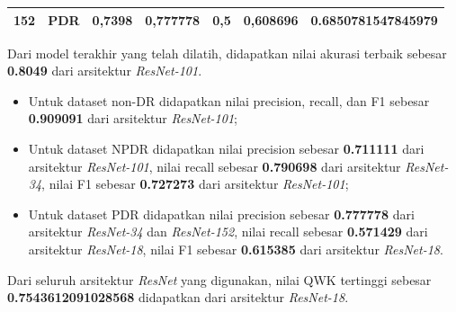 \begin{table}[hbtp]
\begin{center}
\begin{tabular}{|c|l|c|l|l|l|c|}
			\multirow{-3}{*}{152} & PDR                                                & \multirow{-3}{*}{0,7398} & \textbf{0,777778}                                          & 0,5                                              & 0,608696                                        & \multirow{-3}{*}{0.6850781547845979} \\ \hline
		\end{tabular}
	\end{center}
\end{table}

Dari model terakhir yang telah dilatih, didapatkan nilai akurasi terbaik sebesar \textbf{0.8049} dari arsitektur \emph{ResNet-101}.

\begin{itemize}
	
	\item Untuk dataset non-DR didapatkan nilai precision, recall, dan F1 sebesar \textbf{0.909091} dari arsitektur \emph{ResNet-101};
	
	\item Untuk dataset NPDR didapatkan nilai precision sebesar \textbf{0.711111} dari arsitektur \emph{ResNet-101}, nilai recall sebesar \textbf{0.790698} dari arsitektur \emph{ResNet-34}, nilai F1 sebesar \textbf{0.727273} dari arsitektur \emph{ResNet-101};
	
	\item Untuk dataset PDR didapatkan nilai precision sebesar \textbf{0.777778} dari arsitektur \emph{ResNet-34} dan \emph{ResNet-152}, nilai recall sebesar \textbf{0.571429} dari arsitektur \emph{ResNet-18}, nilai F1 sebesar \textbf{0.615385} dari arsitektur \emph{ResNet-18}.
	
\end{itemize}

Dari seluruh arsitektur \emph{ResNet} yang digunakan, nilai QWK tertinggi sebesar \textbf{0.7543612091028568} didapatkan dari arsitektur \emph{ResNet-18}.

